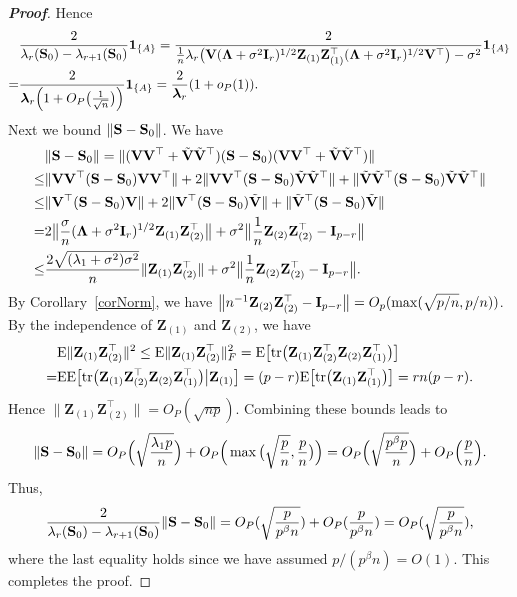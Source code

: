 \documentclass[times,sort&compress,3p]{elsarticle}
\newcommand{\mytr}{ {\rm tr} }
\newcommand{\myE}{ {\rm E} }
\newcommand{\bZ}{\mathbf{Z}}
\newcommand{\bfsym}[1]{\ensuremath{\boldsymbol{#1}}}
\def\blambda {\bfsym {\lambda}}        \def\bLambda {\bfsym {\Lambda}}
\theoremstyle{plain}
\theoremstyle{definition}
\theoremstyle{remark}
\begin{document}
\begin{appendices}
\begin{proof}[\textbf{Proof}]
        Hence
$$
\begin{aligned}
    &\frac{2}{\lambda_r(\BS_0)-\lambda_{r+1}(\BS_0)}\mathbf{1}_{\{A\}}
    =
    \frac{2}{
        \frac{1}{n}\lambda_r\big(\BV(\bLambda+\sigma^2 \BI_r)^{1/2}\bZ_{(1)} \bZ_{(1)}^\top (\bLambda+\sigma^2 \BI_r)^{1/2}\BV^\top \big)-\sigma^2}\mathbf{1}_{\{A\}}\\
    =&\frac{2}{\blambda_r\Big(1+O_P\big(\frac{1}{\sqrt{n}}\big)\Big)}\mathbf{1}_{\{A\}}
    =\frac{2}{\blambda_r}(1+o_P(1)).
\end{aligned}
    $$
    Next we bound $\|\mathbf{S}-\mathbf{S}_0\|$. 
    We have
    $$
    \begin{aligned}
        &\|\BS-\BS_0\|=
        \|(\BV\BV^\top +\tilde{\BV}\tilde{\BV}^\top )(\BS-\BS_0)(\BV\BV^\top +\tilde{\BV}\tilde{\BV}^\top )\|\\
        \leq& \|\BV\BV^\top  (\BS-\BS_0) \BV\BV^\top \|+2 \|\BV\BV^\top  (\BS-\BS_0) \tilde{\BV}\tilde{\BV}^\top \|+\|\tilde{\BV}\tilde{\BV}^\top  (\BS-\BS_0) \tilde{\BV}\tilde{\BV}^\top \|\\
        \leq& \|\BV^\top  (\BS-\BS_0) \BV\|+2 \|\BV^\top  (\BS-\BS_0) \tilde{\BV}\|+\|\tilde{\BV}^\top  (\BS-\BS_0) \tilde{\BV}\|\\
        = &
        2\big\|\frac{\sigma}{n}(\bLambda+\sigma^2 \BI_r)^{1/2}\bZ_{(1)} \bZ_{(2)}^\top \big\|+
        \sigma^2\big\|\frac{1}{n}\bZ_{(2)} \bZ_{(2)}^\top - \BI_{p-r}\big\|\\
        \leq & \frac{2\sqrt{(\lambda_1+\sigma^2)\sigma^2}}{n}\|\bZ_{(1)}\bZ_{(2)}^\top \|+
        \sigma^2\big\|\frac{1}{n}\bZ_{(2)} \bZ_{(2)}^\top - \BI_{p-r}\big\|.
    \end{aligned}
    $$
    By Corollary~\ref{corNorm}, we have $\big\|n^{-1}\bZ_{(2)} \bZ_{(2)}^\top - \BI_{p-r}\big\|=O_p(\max(\sqrt{p/n},p/n))$.
    By the independence of $\bZ_{(1)}$ and $\bZ_{(2)}$, we have
    $$
    \begin{aligned}
        &\myE \|\bZ_{(1)}\bZ_{(2)}^\top \|^2\leq
    \myE \|\bZ_{(1)}\bZ_{(2)}^\top \|_F^2
    =
    \myE \big[ \mytr\big(\bZ_{(1)}\bZ_{(2)}^\top \bZ_{(2)}\bZ_{(1)}^\top \big) \big]\\
        =&
        \myE\myE \big[ \mytr\big(\bZ_{(1)}\bZ_{(2)}^\top \bZ_{(2)}\bZ_{(1)}^\top \big)\big|\BZ_{(1)} \big]
        =(p-r)
    \myE \big[ \mytr\big(\bZ_{(1)}\bZ_{(1)}^\top \big) \big]
        =rn(p-r).
    \end{aligned}
    $$
    Hence $\|\bZ_{(1)}\bZ_{(2)}^\top \|=O_P(\sqrt{np})$.
    Combining these bounds leads to
    $$
    \|\mathbf{S}-\mathbf{S}_0\|=
 O_P\Big(\sqrt{\frac{\lambda_1 p}{n}}\Big)+O_P\Big(\max\big(\sqrt{\frac{p}{n}},\frac{p}{n}\big)\Big)
    =
    O_P\Big(\sqrt{\frac{ p^{\beta}p}{n}}\Big)+O_P\Big(\frac{p}{n}\Big).
    $$
    Thus,
    $$
   \frac{2}{\lambda_r(\mathbf{S}_0)-\lambda_{r+1}(\mathbf{S}_0)}\|\mathbf{S}-\mathbf{S}_0\|=
    O_P(\sqrt{\frac{p}{p^{\beta}n}})+O_P(\frac{p}{p^{\beta}n})=
O_P(\sqrt{\frac{p}{p^{\beta}n}}),
    $$
    where the last equality holds since we have assumed $p/(p^{\beta}n)=O(1)$.
    This completes the proof.


\end{proof}
\end{appendices}
\end{document}
